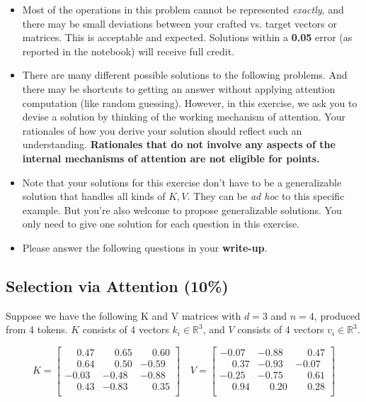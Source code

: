 \documentclass{article}
\begin{document}
\begin{itemize}
    \item Most of the operations in this problem cannot be represented
    \textit{exactly}, and there may be small deviations between your crafted vs.
    target vectors or matrices. This is acceptable and expected. Solutions
    within a \textbf{0.05} error (as reported in the notebook) will receive full
    credit.
    
    \item There are many different possible solutions to the following problems.
    And there may be shortcuts to getting an answer without applying attention
    computation (like random guessing). However, in this exercise, we ask you to
    devise a solution by thinking of the working mechanism of attention. Your
    rationales of how you derive your solution should reflect such an
    understanding. \textbf{Rationales that do not involve any aspects of the
    internal mechanisms of attention are not eligible for points.}
    
    \item Note that your solutions for this exercise don't have to be a
    generalizable solution that handles all kinds of $K,V$. They can be
    \textit{ad hoc} to this specific example. But you're also welcome to propose
    generalizable solutions. You only need to give one solution for each
    question in this exercise.

    \item Please answer the following questions in your \textbf{write-up}.

\end{itemize}


\subsection{Selection via Attention (10\%)}

Suppose we have the following K and V matrices with $d=3$ and $n=4$, produced
from 4 tokens. $K$ consists of 4 vectors $k_i \in \mathbb{R}^3$, and $V$
consists of 4 vectors $v_i \in \mathbb{R}^3$.

$$
    K =
\begin{bmatrix}
 \phantom{-}0.47 &  \phantom{-}0.65 &  \phantom{-}0.60 \\
 \phantom{-}0.64 &  \phantom{-}0.50 & -0.59 \\
-0.03 & -0.48 & -0.88 \\
 \phantom{-}0.43 & -0.83 &  \phantom{-}0.35 \\
\end{bmatrix}
    \quad
    V =
\begin{bmatrix}
-0.07 & -0.88 &  \phantom{-}0.47 \\
 \phantom{-}0.37 & -0.93 & -0.07 \\
-0.25 & -0.75 &  \phantom{-}0.61 \\
 \phantom{-}0.94 &  \phantom{-}0.20 &  \phantom{-}0.28 \\
\end{bmatrix}
$$
\end{document}
